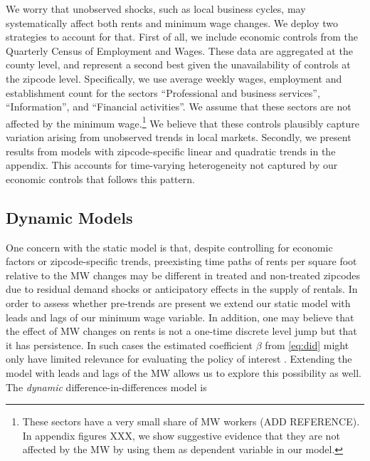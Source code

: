 
We worry that unobserved shocks, such as local business cycles, may systematically 
affect both rents and minimum wage changes. We deploy two strategies to account 
for that. First of all, we include economic controls from the Quarterly Census of 
Employment and Wages. These data are aggregated at the county level, and represent a 
second best given the unavailability of controls at the zipcode level. Specifically, we 
use average weekly wages, employment and establishment count for the sectors 
``Professional and business services'', ``Information'', and ``Financial activities''. 
We assume that these sectors are not affected by the minimum wage.\footnote{These sectors have a very small share of MW workers (ADD REFERENCE). In appendix figures XXX, we show suggestive evidence that they are not affected by the MW by using them as dependent variable in our model.}
We believe that these controls plausibly capture variation arising from unobserved trends 
in local markets. Secondly, we present results from models with zipcode-specific linear 
and quadratic trends in the appendix. This accounts for time-varying heterogeneity not 
captured by our economic controls that follows this pattern.

\subsection{Dynamic Models}

One concern with the static model is that, despite controlling for economic 
factors or zipcode-specific trends, preexisting time paths of rents per square foot relative to the MW changes may  be different in treated and non-treated zipcodes due to residual demand shocks or anticipatory effects 
in the supply of rentals. In order to assess whether pre-trends are present we extend our 
static model with leads and lags of our minimum wage variable. In addition, one may 
believe that the effect of MW changes on rents is not a one-time discrete level jump but 
that it has persistence. In such cases the estimated coefficient $\beta$ from 
\autoref{eq:did} might only have limited relevance for evaluating the policy of interest 
\parencite{callaway2019}. Extending the model with leads and lags of the MW allows us to 
explore this possibility as well. The \textit{dynamic} difference-in-differences model is

